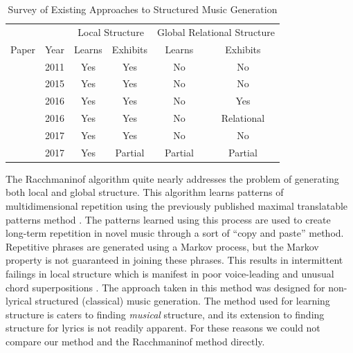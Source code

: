 \documentclass[phd,electronic,oneside,twosidetoc,letterpaper,chaptercenter,parttop,lol,lof,lot]{byumsphd}
\begin{document}
\begin{table}[h]
\centering
\begin{tabular}{@{}lc|cc|cc|@{}}
      &      & \multicolumn{2}{c|}{Local Structure} & \multicolumn{2}{c|}{Global Relational Structure} \\ 
Paper & Year & Learns          & Exhibits         & Learns          & Exhibits          \\ \midrule
\citet{pachet2011finite}  & 2011 & Yes              & Yes                & No              & No                 \\
\citet{papadopoulos2015exact}  & 2015 & Yes              & Yes                & No              &  No           \\
 \citet{roy2016enforcing}  & 2016 & Yes              & Yes                & No              & Yes                 \\
  \citet{Jaques2016}  & 2016 & Yes             & Yes                & No              & Relational                 \\
\citet{perez2017mdds}  & 2017 & Yes              & Yes                & No              & No                 \\ 
\citet{collins2017computer}  & 2017 & Yes              & Partial                & Partial              & Partial        \\
\end{tabular}
\caption{Survey of Existing Approaches to Structured Music Generation}
\label{tab:systems}
\end{table}

The Racchmaninof algorithm \cite{collins2017computer} quite nearly addresses the problem of generating both local and global structure. This algorithm learns patterns of multidimensional repetition using the previously published maximal translatable patterns method \cite{meredith2002algorithms}. The patterns learned using this process are used to create long-term repetition in novel music through a sort of ``copy and paste'' method. Repetitive phrases are generated using a Markov process, but the Markov property is not guaranteed in joining these phrases. This results in intermittent failings in local structure which is manifest in poor voice-leading and unusual chord superpositions \cite{collins2017computer}. The approach taken in this method was designed for non-lyrical structured (classical) music generation. The method used for learning structure is caters to finding \emph{musical} structure, and its extension to finding structure for lyrics is not readily apparent. For these reasons we could not compare our method and the Racchmaninof method directly.
\end{document}
